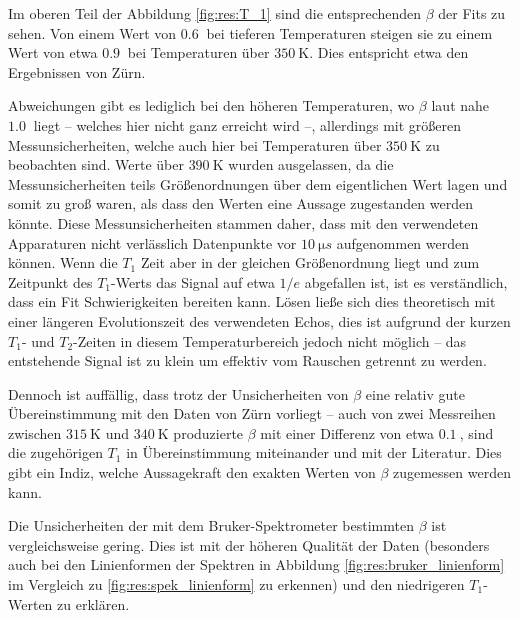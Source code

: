 Im oberen Teil der Abbildung \ref{fig:res:T_1} sind die entsprechenden $\beta$ der Fits zu sehen. Von einem Wert von $\SI{0.6}{}$ bei tieferen Temperaturen steigen sie zu einem Wert von etwa $\SI{0.9}{}$ bei Temperaturen über $\SI{350}{\kelvin}$. Dies entspricht etwa den Ergebnissen von Zürn.

Abweichungen gibt es lediglich bei den höheren Temperaturen, wo $\beta$ laut \cite{zuern_paper} nahe $\SI{1.0}{}$ liegt -- welches hier nicht ganz erreicht wird --, allerdings mit größeren Messunsicherheiten, welche auch hier bei Temperaturen über $\SI{350}{\kelvin}$ zu beobachten sind. Werte über $\SI{390}{\kelvin}$ wurden ausgelassen, da die Messunsicherheiten teils Größenordnungen über dem eigentlichen Wert lagen und somit zu groß waren, als dass den Werten eine Aussage zugestanden werden könnte. Diese Messunsicherheiten stammen daher, dass mit den verwendeten Apparaturen nicht verlässlich Datenpunkte vor $\SI{10}{\micro s}$ aufgenommen werden können. Wenn die $T_1$ Zeit aber in der gleichen Größenordnung liegt und zum Zeitpunkt des $T_1$-Werts das Signal auf etwa $1/e$ abgefallen ist, ist es verständlich, dass ein Fit Schwierigkeiten bereiten kann. Lösen ließe sich dies theoretisch mit einer längeren Evolutionszeit des verwendeten Echos, dies ist aufgrund der kurzen $T_1$- und $T_2$-Zeiten in diesem Temperaturbereich jedoch nicht möglich -- das entstehende Signal ist zu klein um effektiv vom Rauschen getrennt zu werden.

Dennoch ist auffällig, dass trotz der Unsicherheiten von $\beta$ eine relativ gute Übereinstimmung mit den Daten von Zürn vorliegt -- auch von zwei Messreihen zwischen $\SI{315}{\kelvin}$ und $\SI{340}{\kelvin}$ produzierte $\beta$ mit einer Differenz von etwa $\SI{0.1}{}$, sind die zugehörigen $T_1$ in Übereinstimmung miteinander und mit der Literatur. Dies gibt ein Indiz, welche Aussagekraft den exakten Werten von $\beta$ zugemessen werden kann.

Die Unsicherheiten der mit dem Bruker-Spektrometer bestimmten $\beta$ ist vergleichsweise gering. Dies ist mit der höheren Qualität der Daten (besonders auch bei den Linienformen der Spektren in Abbildung \ref{fig:res:bruker_linienform} im Vergleich zu \ref{fig:res:spek_linienform} zu erkennen) und den niedrigeren $T_1$-Werten zu erklären.



\par\bigskip


